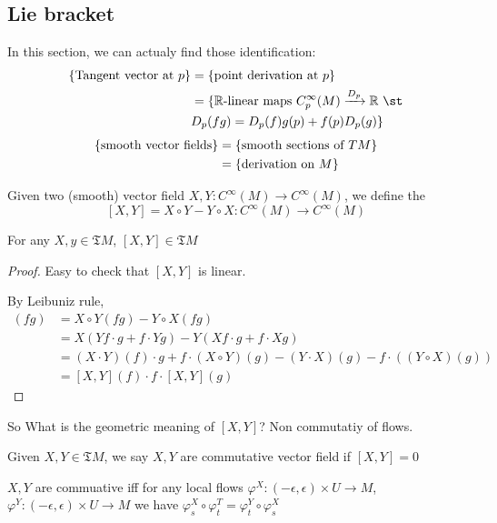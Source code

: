 \subsection{Lie bracket}
In this section, we can actualy find those identification:
\begin{align*}
    \{\text{Tangent vector at $ p $}\}&=\{\text{point derivation at $ p $}\}\\
    &=\{\text{$ \mathbb{R} $-linear maps  $ C^\infty_p(M)\xrightarrow{D_p} \mathbb{R} $ \st}\\&D_p(fg)=D_p(f)g(p)+f(p)D_p(g)\}
\end{align*}
\begin{align*}
    \{\text{smooth vector fields}\}&=\{\text{smooth sections of  $ TM $}\}\\
    &=\{\text{derivation on  $ M $}\}
\end{align*}
\begin{definition}
    Given two (smooth) vector field  $ X,Y:C^\infty(M)\rightarrow C^\infty(M) $, we define the 
    \[[X,Y]=X\circ Y-Y\circ X:C^\infty(M)\rightarrow C^\infty(M)\] 
\end{definition}
\begin{theorem}
    For any  $ X,y\in\mathfrak{T}M $,  $ [X,Y]\in \mathfrak{T}M $  
\end{theorem}
\begin{proof}
    Easy to check that  $ [X,Y] $ is linear.
    
    By Leibuniz rule,
    \begin{align*}
        [X,Y](fg)&=X\circ Y(fg)-Y\circ X(fg)\\
        &=X(Yf\cdot g+f\cdot Yg)-Y(Xf\cdot g+f\cdot Xg)\\
        &=(X\cdot Y)(f)\cdot g+f\cdot(X\circ Y)(g)-(Y\cdot X)(g)-f\cdot ((Y\circ X)(g))\\
        &=[X,Y](f)\cdot f\cdot [X,Y](g)
    \end{align*}
\end{proof}
So What is the geometric meaning of  $ [X,Y] $? Non commutatiy of flows.
\begin{fact}
    Given  $ X,Y\in \mathfrak{T}M $, we say  $ X,Y $ are commutative vector field if  $ [X,Y]=0 $
    
    $ X,Y $ are commuative iff  for any local flows  $ \varphi^X:(-\epsilon,\epsilon)\times U\rightarrow M $, $ \varphi^Y:(-\epsilon,\epsilon)\times U\rightarrow M $  we have $ \varphi_s^X\circ \varphi_t^T=\varphi_t^Y\circ\varphi_s^X $   
\end{fact} 


